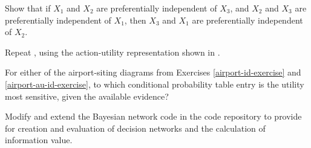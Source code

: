 \begin{iexercise}
Show that if \(X_1\) and \(X_2\) are preferentially independent of \(X_3\),
and \(X_2\) and \(X_3\) are preferentially independent of \(X_1\), then 
\(X_3\) and \(X_1\) are preferentially independent
of \(X_2\).
\end{iexercise} 

\begin{exercise}%
Repeat , using the action-utility
representation shown in .
\end{exercise} 

\begin{exercise}
For either of the airport-siting diagrams from Exercises
\ref{airport-id-exercise} and \ref{airport-au-id-exercise},
to which conditional probability table entry is the utility most sensitive,
given the available evidence?
\end{exercise} 



\begin{iexercise}\prgex
Modify and extend the Bayesian network code in the code repository to
provide for creation and evaluation of decision networks and the calculation of information value.
\end{iexercise} 

